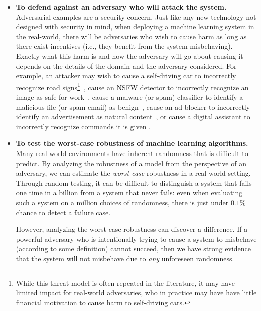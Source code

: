 \documentclass{article} %
\begin{document}
\begin{itemize}

\item \textbf{To defend against an adversary who will attack the system.}
  Adversarial examples are a security concern.
  Just like any new technology not designed with security in mind,
  when deploying a machine learning system in the real-world,
  there will be adversaries who wish to cause harm as long as there
  exist incentives (i.e., they benefit from the system misbehaving).
  Exactly what this
  harm is and how the adversary will go about causing it depends on the details of
  the domain and the adversary considered.
  For example, an attacker may wish to cause a self-driving car to
  incorrectly recognize road signs\footnote{While this threat model is often repeated
  	in the literature, it may have limited impact for
  	real-world adversaries, who in practice may have
        have little financial motivation to
  	cause harm to self-driving cars.}~\citep{papernot2016limitations},
  cause an NSFW detector to incorrectly
  recognize an image as safe-for-work~\citep{bhagoji2018practical},
  cause a malware (or spam) classifier
  to identify a malicious file (or spam email) as benign~\citep{dahl2013large}, cause an
  ad-blocker to incorrectly identify an advertisement as natural content~\citep{tramer2018ad},
  or cause a digital assistant to incorrectly recognize commands it is given \citep{carlini2016hidden}.

\item \textbf{To test the worst-case robustness of machine learning algorithms.}
  Many real-world environments have inherent randomness that is difficult to
  predict.
  By analyzing the robustness of a model from the perspective of an
  adversary, we can estimate the \emph{worst-case} robustness
  in a real-world setting.
  Through random testing,
  it can be difficult to distinguish a system that fails
  one time in a billion from a system that never fails: even when evaluating
  such a system on a million choices of randomness, there is just under $0.1\%$ chance
  to detect a failure case.

  However, analyzing the worst-case robustness can discover a difference.
  If a powerful adversary who is intentionally trying to cause a system to misbehave (according
  to some definition) cannot
  succeed, then we have strong evidence that the system will not misbehave due to
  \emph{any} unforeseen randomness.


\end{itemize}
\end{document}
